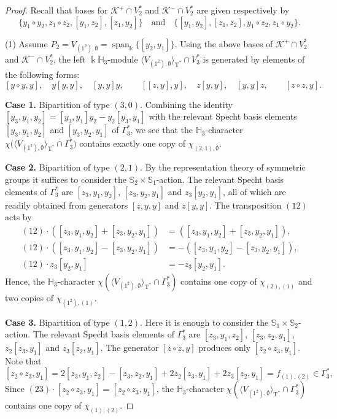 \documentclass[10pt,a4paper]{amsart}
\def \Ga{\Gamma}
\def \H{\mathbb{H}}
\def \K{\mathcal{K}}
\def \S{\mathbb{S}}
\def \T{\operatorname{T}}
\def \es{\emptyset}
\def \k{\Bbbk}
\newcommand{\lr}[1]{\langle #1 \rangle}
\def \sp{\operatorname{span}}
\begin{document}
\begin{proof}
	Recall that bases for $\K^+ \cap V_2^*$ and $\K^- \cap V_2^*$ are given respectively by 
	\[
	\{y_1 \circ y_2, z_1 \circ z_2, [y_1,z_2], [z_1,y_2]\} \quad \text{and} \quad \{[y_1,y_2], [z_1,z_2], y_1 \circ z_2, z_1 \circ y_2\}.
	\]
	
	(1) Assume $P_2 = V_{(1^2), \es} = \sp_\k \{[y_2, y_1] \}$. Using the above bases of $\K^+ \cap V_2^*$ and $\K^- \cap V_2^*$, the left $\k\H_3$-module $\lr{V_{(1^2), \es}}_{\T^*} \cap V_3^*$ is generated by elements of the following forms:
	\[
	[y \circ y, y], \quad y[y,y], \quad [y,y]y, \qquad [[z,y],y], \quad z[y,y], \quad [y,y]z, \qquad [z \circ z, y].
	\]
	
	\textbf{Case 1.} Bipartition of type $(3,0)$. Combining the identity $[y_3,y_1,y_2]=[y_3,y_1]y_2-y_2[y_3,y_1]$ with the relevant Specht basis elements $[y_3,y_1,y_2]$ and $[y_3,y_2,y_1]$ of $\Ga_3^*$, we see that the $\H_3$-character $\chi\big(\lr{V_{(1^2), \es}}_{\T^*} \cap \Ga_3^*\big)$ contains exactly one copy of $\chi_{(2,1),\es}$.
	
	\textbf{Case 2.} Bipartition of type $(2,1)$. By the representation theory of symmetric groups it suffices to consider the $\S_2\times\S_1$-action. The relevant Specht basis elements of $\Ga_3^*$ are $[z_3,y_1,y_2]$, $[z_3,y_2,y_1]$ and $z_3[y_2,y_1]$, all of which are readily obtained from generators $[z,y,y]$ and $z[y,y]$. The transposition $(12)$ acts by
	\begin{align*}
		(12)\cdot([z_3,y_1,y_2]+[z_3,y_2,y_1])&=([z_3,y_1,y_2]+[z_3,y_2,y_1]),\\
		(12)\cdot([z_3,y_1,y_2]-[z_3,y_2,y_1])&=-([z_3,y_1,y_2]-[z_3,y_2,y_1]),\\
		(12)\cdot z_3[y_2,y_1]&=-z_3[y_2,y_1].
	\end{align*}
	Hence, the $\H_3$-character $\chi( \lr{V_{(1^2), \es}}_{\T^*} \cap \Ga_3^* )$ contains one copy of $\chi_{(2),(1)}$ and two copies of $\chi_{(1^2),(1)}$.	
	
	\textbf{Case 3.} Bipartition of type $(1,2)$. Here it is enough to consider the $\S_1\times\S_2$-action. The relevant Specht basis elements of $\Ga_3^*$ are $[z_3,y_1,z_2]$, $[z_3,z_2,y_1]$, $z_2[z_3,y_1]$ and $z_3[z_2,y_1]$. The generator $[z\circ z,y]$ produces only $[z_2\circ z_3,y_1]$. Note that
	\[
	[z_2 \circ z_3,y_1]=2[z_3,y_1,z_2]-[z_3,z_2,y_1]+2z_2[z_3,y_1]+2z_3[z_2,y_1] = f_{(1),(2)} \in \Ga_3^*,
	\]
	Since $(23)\cdot [z_2 \circ z_3,y_1] = [z_2 \circ z_3,y_1]$, the $\H_3$-character $\chi({\lr{V_{(1^2), \es}}_{\T^*} \cap \Ga_3^*})$ contains one copy of $\chi_{(1),(2)}$.
	

\end{proof}
\end{document}
